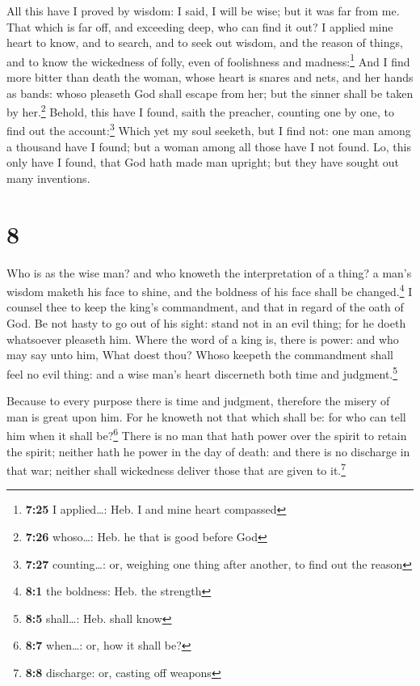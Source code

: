  All this have I proved by wisdom: I said, I will be
wise; but it was far from me.  That which is far off, and
exceeding deep, who can find it out?  I applied mine
heart to know, and to search, and to seek out wisdom, and the reason of
things, and to know the wickedness of folly, even of foolishness and
madness:\footnote{\textbf{7:25} I applied\ldots: Heb. I and mine heart
  compassed}  And I find more bitter than death the
woman, whose heart is snares and nets, and her hands as bands: whoso
pleaseth God shall escape from her; but the sinner shall be taken by
her.\footnote{\textbf{7:26} whoso\ldots: Heb. he that is good before God}
 Behold, this have I found, saith the preacher, counting
one by one, to find out the account:\footnote{\textbf{7:27}
  counting\ldots: or, weighing one thing after another, to find out the
  reason}  Which yet my soul seeketh, but I find not: one
man among a thousand have I found; but a woman among all those have I
not found.  Lo, this only have I found, that God hath
made man upright; but they have sought out many inventions.

\hypertarget{section-7}{%
\section{8}\label{section-7}}

 Who is as the wise man? and who knoweth the
interpretation of a thing? a man's wisdom maketh his face to shine, and
the boldness of his face shall be changed.\footnote{\textbf{8:1} the
  boldness: Heb. the strength}  I counsel thee to keep the
king's commandment, and that in regard of the oath of God.
 Be not hasty to go out of his sight: stand not in an evil
thing; for he doeth whatsoever pleaseth him.  Where the
word of a king is, there is power: and who may say unto him, What doest
thou?  Whoso keepeth the commandment shall feel no evil
thing: and a wise man's heart discerneth both time and
judgment.\footnote{\textbf{8:5} shall\ldots: Heb. shall know}

 Because to every purpose there is time and judgment,
therefore the misery of man is great upon him.  For he
knoweth not that which shall be: for who can tell him when it shall
be?\footnote{\textbf{8:7} when\ldots: or, how it shall be?}
 There is no man that hath power over the spirit to retain
the spirit; neither hath he power in the day of death: and there is no
discharge in that war; neither shall wickedness deliver those that are
given to it.\footnote{\textbf{8:8} discharge: or, casting off weapons}

